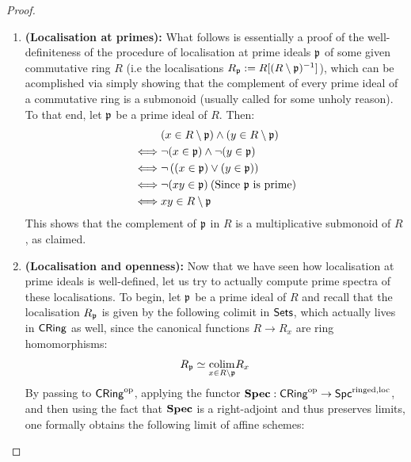                     \begin{proof}
                        \noindent
                        \begin{enumerate}
                            \item \textbf{(Localisation at primes):} What follows is essentially a proof of the well-definiteness of the procedure of localisation at prime ideals $\mathfrak{p}$ of some given commutative ring $R$ (i.e the localisations $R_{\mathfrak{p}} := R[(R \setminus \mathfrak{p})^{-1}]$), which can be acomplished via simply showing that the complement of every prime ideal of a commutative ring is a submonoid (usually called  for some unholy reason). To that end, let $\mathfrak{p}$ be a prime ideal of $R$. Then:
                                $$
                                    \begin{aligned}
                                        & (x \in R \setminus \mathfrak{p}) \wedge (y \in R \setminus \mathfrak{p})
                                        \\
                                        \iff & \neg(x \in \mathfrak{p}) \wedge \neg(y \in \mathfrak{p})
                                        \\
                                        \iff & \neg\left((x \in \mathfrak{p}) \vee (y \in \mathfrak{p})\right)
                                        \\
                                        \iff & \neg (xy \in \mathfrak{p}) \: \text{(Since $\mathfrak{p}$ is prime)}
                                        \\
                                        \iff & xy \in R \setminus \mathfrak{p}
                                    \end{aligned}
                                $$
                            This shows that the complement of $\mathfrak{p}$ in $R$ is a multiplicative submonoid of $R$, as claimed.
                            \item \textbf{(Localisation and openness):} Now that we have seen how localisation at prime ideals is well-defined, let us try to actually compute prime spectra of these localisations. To begin, let $\mathfrak{p}$ be a prime ideal of $R$ and recall that the localisation $R_{\mathfrak{p}}$ is given by the following colimit in $\mathsf{Sets}$, which actually lives in $\mathsf{CRing}$ as well, since the canonical functions $R \to R_x$ are ring homomorphisms:
                                $$R_{\mathfrak{p}} \simeq \underset{x \in R \setminus \mathfrak{p}}{\operatorname{colim}} R_x$$
                            By passing to $\mathsf{CRing}^{\mathrm{op}}$, applying the functor $\mathbf{Spec}: \mathsf{CRing}^{\mathrm{op}} \to \mathsf{Spc}^{\mathrm{ringed}, \mathrm{loc}}$, and then using the fact that $\mathbf{Spec}$ is a right-adjoint and thus preserves limits, one formally obtains the following limit of affine schemes:

\end{enumerate}
\end{proof}
